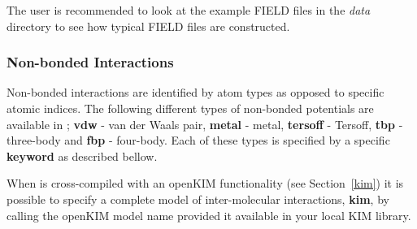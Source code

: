 The user is recommended to look at the example FIELD files in the {\em
data} directory to see how typical FIELD files are constructed.

\subsubsection*{Non-bonded Interactions}

Non-bonded interactions are identified by atom types as opposed to
specific atomic indices.  The following different types of
non-bonded potentials are available in
\D; {\bf vdw} - van der Waals pair,
{\bf metal} - metal, {\bf tersoff} -
Tersoff, {\bf tbp} -
three-body and {\bf fbp} -
four-body.  Each of these types is
specified by a specific {\bf keyword} as described bellow.

When \D is cross-compiled with an openKIM functionality (see
Section~\ref{kim}) it is possible to specify a complete model of
inter-molecular interactions, {\bf kim}, by calling the openKIM
model name provided it available in your local KIM library.

